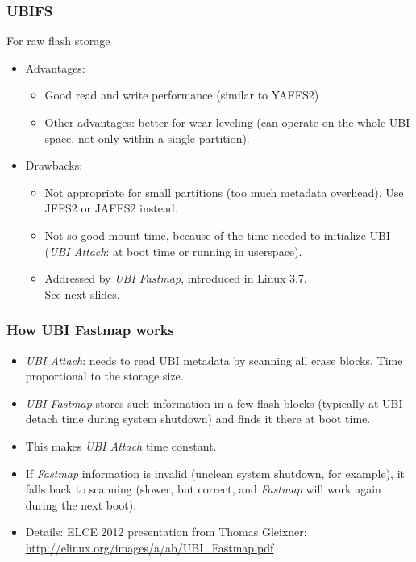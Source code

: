 \begin{frame}
\frametitle{UBIFS}
For raw flash storage
\begin{itemize}
\item Advantages:
      \begin{itemize}
      \item Good read and write performance (similar to YAFFS2)
      \item Other advantages: better for wear leveling (can operate on the
      	    whole UBI space, not only within a single partition).
      \end{itemize}
\item Drawbacks:
      \begin{itemize}
      \item Not appropriate for small partitions (too much metadata
   	    overhead). Use JFFS2 or JAFFS2 instead.
      \item Not so good mount time, because of the time needed
            to initialize UBI ({\em UBI Attach}: at boot time or running
             in userspace).
      \item Addressed by {\em UBI Fastmap}, introduced in Linux 3.7. \\
            See next slides.
      \end{itemize}
\end{itemize}
\end{frame}

\begin{frame}
\frametitle{How UBI Fastmap works}
\begin{itemize}
\item {\em UBI Attach}: needs to read UBI metadata by
      scanning all erase blocks. Time proportional
      to the storage size. 
\item {\em UBI Fastmap} stores such information in a few flash
      blocks (typically at UBI detach time during system
      shutdown) and finds it there at boot time.
\item This makes {\em UBI Attach} time constant.
\item If {\em Fastmap} information is invalid (unclean system
      shutdown, for example), it falls back to scanning
      (slower, but correct, and {\em Fastmap} will work again
      during the next boot).
\item Details: ELCE 2012 presentation from Thomas Gleixner:
      \url{http://elinux.org/images/a/ab/UBI_Fastmap.pdf}
\end{itemize}
\end{frame}

